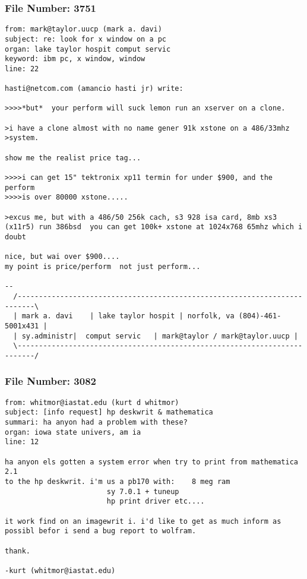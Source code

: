 \subsubsection*{File Number: 3751}
\scriptsize\begin{verbatim}
from: mark@taylor.uucp (mark a. davi)
subject: re: look for x window on a pc
organ: lake taylor hospit comput servic
keyword: ibm pc, x window, window
line: 22

hasti@netcom.com (amancio hasti jr) write:

>>>>*but*  your perform will suck lemon run an xserver on a clone.

>i have a clone almost with no name gener 91k xstone on a 486/33mhz
>system.

show me the realist price tag...

>>>>i can get 15" tektronix xp11 termin for under $900, and the perform
>>>>is over 80000 xstone.....

>excus me, but with a 486/50 256k cach, s3 928 isa card, 8mb xs3 (x11r5) run 386bsd  you can get 100k+ xstone at 1024x768 65mhz which i doubt 

nice, but wai over $900....
my point is price/perform  not just perform...

-- 
  /--------------------------------------------------------------------------\
  | mark a. davi    | lake taylor hospit | norfolk, va (804)-461-5001x431 |
  | sy.administr|  comput servic   | mark@taylor / mark@taylor.uucp |
  \--------------------------------------------------------------------------/
\end{verbatim}
\subsubsection*{File Number: 3082}
\scriptsize\begin{verbatim}
from: whitmor@iastat.edu (kurt d whitmor)
subject: [info request] hp deskwrit & mathematica
summari: ha anyon had a problem with these?
organ: iowa state univers, am ia
line: 12

ha anyon els gotten a system error when try to print from mathematica 2.1
to the hp deskwrit. i'm us a pb170 with:	8 meg ram
						sy 7.0.1 + tuneup
						hp print driver etc....

it work find on an imagewrit i. i'd like to get as much inform as
possibl befor i send a bug report to wolfram.

thank.

-kurt (whitmor@iastat.edu)

\end{verbatim}
